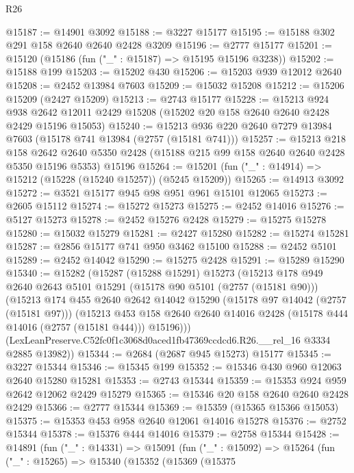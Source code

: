 \begin{lexlean}{R26}
\begin{coremodule}
@15187 := @14901 @3092
@15188 := @3227 @15177
@15195 := @15188 @302 @291 @158 @2640 @2640 @2428 @3209
@15196 := @2777 @15177
@15201 := @15120 (@15186 (fun ("_" : @15187) => @15195 @15196 @3238))
@15202 := @15188 @199
@15203 := @15202 @430
@15206 := @15203 @939 @12012 @2640
@15208 := @2452 @13984 @7603
@15209 := @15032 @15208
@15212 := @15206 @15209 (@2427 @15209)
@15213 := @2743 @15177
@15228 := @15213
    @924
    @938
    @2642
    @12011
    @2429
    @15208
    (@15202 @20 @158 @2640 @2640 @2428 @2429 @15196 @15053)
@15240 := @15213 @936 @220 @2640 @7279 @13984 @7603 (@15178 @741 @13984 (@2757 (@15181 @741)))
@15257 := @15213
    @218
    @158
    @2642
    @2640
    @5350
    @2428
    (@15188 @215 @99 @158 @2640 @2640 @2428 @5350 @15196 @5353)
    @15196
@15264 := @15201 (fun ("_" : @14914) => @15212 (@15228 (@15240 @15257)) (@5245 @15209))
@15265 := @14913 @3092
@15272 := @3521 @15177 @945 @98 @951 @961 @15101 @12065
@15273 := @2605 @15112
@15274 := @15272 @15273
@15275 := @2452 @14016
@15276 := @5127 @15273
@15278 := @2452 @15276 @2428
@15279 := @15275 @15278
@15280 := @15032 @15279
@15281 := @2427 @15280
@15282 := @15274 @15281
@15287 := @2856 @15177 @741 @950 @3462 @15100
@15288 := @2452 @5101
@15289 := @2452 @14042
@15290 := @15275 @2428
@15291 := @15289 @15290
@15340 := @15282
    (@15287
      (@15288 @15291)
      @15273
      (@15213
        @178
        @949
        @2640
        @2643
        @5101
        @15291
        (@15178 @90 @5101 (@2757 (@15181 @90)))
        (@15213
          @174
          @455
          @2640
          @2642
          @14042
          @15290
          (@15178 @97 @14042 (@2757 (@15181 @97)))
          (@15213
            @453
            @158
            @2640
            @2640
            @14016
            @2428
            (@15178 @444 @14016 (@2757 (@15181 @444)))
            @15196)))
      (LexLeanPreserve.C52fc0f1c3068d0aced1fb47369ccdcd6.R26.__rel_16 @3334 @2885 @13982))
@15344 := @2684 (@2687 @945 @15273) @15177
@15345 := @3227 @15344
@15346 := @15345 @199
@15352 := @15346 @430 @960 @12063 @2640 @15280 @15281
@15353 := @2743 @15344
@15359 := @15353 @924 @959 @2642 @12062 @2429 @15279
@15365 := @15346 @20 @158 @2640 @2640 @2428 @2429
@15366 := @2777 @15344
@15369 := @15359 (@15365 @15366 @15053)
@15375 := @15353 @453 @958 @2640 @12061 @14016 @15278
@15376 := @2752 @15344
@15378 := @15376 @444 @14016
@15379 := @2758 @15344
@15428 := @14891
    (fun ("_" : @14331) =>
    @15091
      (fun ("_" : @15092) =>
      @15264
        (fun ("_" : @15265) =>
        @15340
          (@15352
            (@15369
              (@15375

\end{coremodule}
\end{lexlean}
